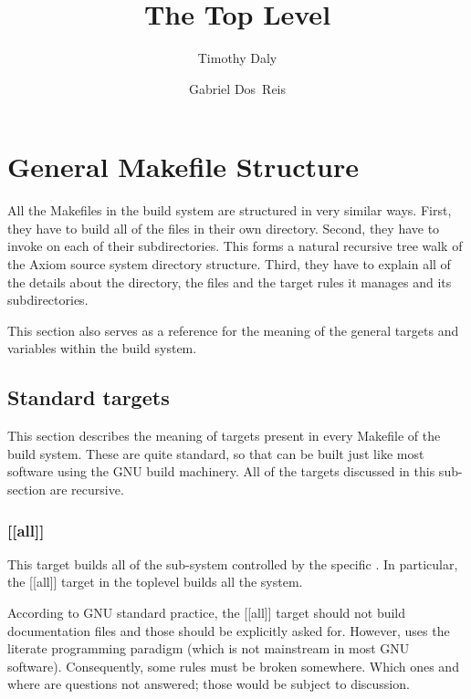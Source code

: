 \documentclass{article}
\title{The Top Level \File{Makefile}}
\author{Timothy Daly \and Gabriel Dos~Reis}
\begin{document}
\maketitle

\begin{abstract}
\end{abstract}
\eject

\tableofcontents
\eject

\section{General Makefile Structure}
\label{sec:general-structure}

All the Makefiles in the  build system are structured in very
similar ways.  First, they have to build all of the files
in their own directory. Second, they have to invoke  on each
of their subdirectories.  This forms a natural recursive tree walk of
the Axiom source system directory structure. Third, they have to
explain all of the details about the directory, the files and the
target rules it manages and its subdirectories.

This section also serves as a reference for the meaning of the
general targets and variables within the  build system.

\subsection{Standard targets}
\label{sec:general-structure:std-targets}

This section describes the meaning of  targets present in every
Makefile of the  build system.  These are quite standard,
so that  can be built just like most software using the
GNU build machinery.  All of the targets discussed in this sub-section
are recursive.

\subsubsection{[[all]]}
\label{sec:general-structure:std-targets:all}

This target builds all of the  sub-system controlled by the
specific .  In particular, the [[all]] target in the
toplevel  builds all the  system.

According to GNU standard practice, the [[all]] target should not
build documentation files and those should be explicitly asked for.
However,  uses the literate programming paradigm (which is
not mainstream in most GNU software).  Consequently, some rules must
be broken somewhere.  Which ones and where are questions not answered;
those would be subject to discussion.
\end{document}
